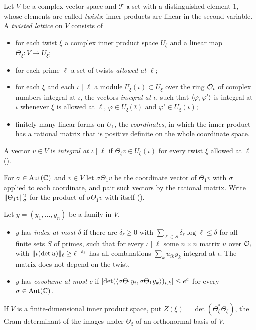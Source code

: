 \begin{definition}\label{setup:def:lattice}
Let $V$ be a complex vector space and $\mathcal{T}$ a set with a distinguished element $1$, whose
elements are called \emph{twists}; inner products are linear in the second variable. A \emph{twisted lattice} on $V$ consists of
\begin{itemize}
\item for each twist $\xi$ a complex inner product space $U_\xi$ and a linear map
  $\Theta_\xi \colon V \to U_\xi$;
\item for each prime $\ell$ a set of twists \emph{allowed at $\ell$};
\item for each $\xi$ and each $\iota \mid \ell$ a module $U_\xi(\iota) \subset U_\xi$ over the
  ring $\mathcal{O}_\iota$ of complex numbers integral at $\iota$, the vectors \emph{integral at $\iota$},
  such that $\langle\varphi, \varphi'\rangle$ is integral at $\iota$ whenever $\xi$ is allowed at $\ell$,
  $\varphi \in U_\xi(\bar\iota)$ and $\varphi' \in U_\xi(\iota)$;
\item finitely many linear forms on $U_1$, the \emph{coordinates}, in which the inner product has a
  rational matrix that is positive definite on the whole coordinate space.
\end{itemize}
A vector $v \in V$ is \emph{integral at $\iota \mid \ell$} if $\Theta_\xi v \in U_\xi(\iota)$ for
every twist $\xi$ allowed at $\ell$ ().
\end{definition}

For $\sigma \in \operatorname{Aut}(\mathbb{C})$ and $v \in V$ let $\sigma\Theta_1 v$ be the coordinate vector of
$\Theta_1 v$ with $\sigma$ applied to each coordinate, and pair such vectors by the rational
matrix. Write $\lVert\Theta_1 v\rVert_\sigma^2$ for the product of $\sigma\Theta_1 v$ with itself
().

\begin{definition}\label{setup:def:index}
Let $y = (y_1, \dots, y_n)$ be a family in $V$.
\begin{itemize}
\item $y$ has \emph{index at most $\delta$} if there are $\delta_\ell \ge 0$ with
  $\sum_{\ell \in S}\delta_\ell\log\ell \le \delta$ for all finite sets $S$ of primes, such that
  for every $\iota \mid \ell$ some $n \times n$ matrix $u$ over $\mathcal{O}_\iota$ with
  $\lVert\iota(\det u)\rVert_\ell \ge \ell^{-\delta_\ell}$ has all combinations $\sum_k u_{ik} y_k$
  integral at $\iota$. The matrix does not depend on the twist.
\item $y$ has \emph{covolume at most $c$} if
  $\lvert\det(\langle\sigma\Theta_1 y_i, \sigma\Theta_1 y_k\rangle)_{i,k}\rvert \le e^{c}$ for every
  $\sigma \in \operatorname{Aut}(\mathbb{C})$.
\end{itemize}
If $V$ is a finite-dimensional inner product space, put $Z(\xi) = \det(\Theta_\xi^*\Theta_\xi)$,
the Gram determinant of the images under $\Theta_\xi$ of an orthonormal basis of $V$.
\end{definition}

